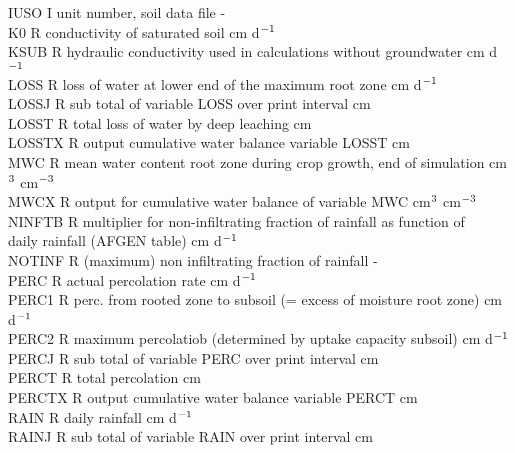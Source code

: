 \documentclass[11pt]{article}
\begin{document}
\begin{tabbing}
IUSO\> \> I\> unit number, soil data file \> \> \> \> \> \> \> -\\
K0\> \> R\> conductivity of saturated soil\> \> \> \> \> \> \> cm d$^{{\rm -1}}$\\
KSUB\> \> R\> hydraulic conductivity used in calculations without groundwater\> \> \> \> \> \> \> cm d$^{{\rm -1}}$\\
LOSS\> \> R\> loss of water at lower end of the maximum root zone\> \> \> \> \> \> \> cm d$^{{\rm -1}}$\\
LOSSJ\> \> R\> sub total of variable LOSS over print interval\> \> \> \> \> \> \> cm\\
LOSST\> \> R\> total loss of water by deep leaching\> \> \> \> \> \> \> cm\\
LOSSTX\> \> R\> output cumulative water balance variable LOSST\> \> \> \> \> \> \> cm\\
MWC\> \> R\> mean water content root zone during crop growth, end of simulation\> \> \> \> \> \> \> cm$^{{\rm 3}}$ cm$^{{\rm -3}}$\\
MWCX\> \> R\> output for cumulative water balance of variable MWC\> \> \> \> \> \> \> cm$^{{\rm 3}}$ cm$^{{\rm -3}}$\\
NINFTB\> \> R\> multiplier for non-infiltrating fraction of rainfall as function of\\
\>\> \> daily rainfall (AFGEN table)\> \> \> \> \> \> \> cm d$^{{\rm -1}}$\\
NOTINF\> \> R\> (maximum) non infiltrating fraction of rainfall\> \> \> \> \> \> \> -\\
PERC\> \> R\> actual percolation rate\> \> \> \> \> \> \> cm d$^{{\rm -1}}$\\
PERC1\> \> R\> perc. from rooted zone to subsoil (= excess of moisture root zone)\> \> \> \> \> \> \> cm d$^{{\rm -1}}$\\
PERC2\> \> R\> maximum percolatiob (determined by uptake capacity subsoil)\> \> \> \> \> \> \> cm d$^{{\rm -1}}$\\
PERCJ\> \> R\> sub total of variable PERC over print interval\> \> \> \> \> \> \> cm\\
PERCT\> \> R\> total percolation\> \> \> \> \> \> \> cm\\
PERCTX\> \> R\> output cumulative water balance variable PERCT\> \> \> \> \> \> \> cm\\
RAIN\> \> R\> daily rainfall\> \> \> \> \> \> \> cm d$^{{\rm -1}}$\\
RAINJ\> \> R\> sub total of variable RAIN over print interval\> \> \> \> \> \> \> cm\\

\end{tabbing}
\end{document}
